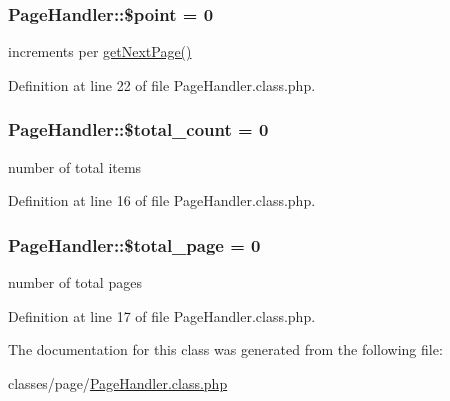 \subsubsection[{\texorpdfstring{\$point}{$point}}]{\setlength{\rightskip}{0pt plus 5cm}Page\+Handler\+::\$point = 0}\hypertarget{classPageHandler_a82a9b55cb98e79d46e6c6648cd2fca26}{}\label{classPageHandler_a82a9b55cb98e79d46e6c6648cd2fca26}


increments per \hyperlink{classPageHandler_a259d01838d005d854d4cc263ba524de7}{get\+Next\+Page()} 



Definition at line 22 of file Page\+Handler.\+class.\+php.

\subsubsection[{\texorpdfstring{\$total\+\_\+count}{$total_count}}]{\setlength{\rightskip}{0pt plus 5cm}Page\+Handler\+::\$total\+\_\+count = 0}\hypertarget{classPageHandler_ad0425a5e936db072a17956e4dada6f2b}{}\label{classPageHandler_ad0425a5e936db072a17956e4dada6f2b}


number of total items 



Definition at line 16 of file Page\+Handler.\+class.\+php.

\subsubsection[{\texorpdfstring{\$total\+\_\+page}{$total_page}}]{\setlength{\rightskip}{0pt plus 5cm}Page\+Handler\+::\$total\+\_\+page = 0}\hypertarget{classPageHandler_adfb101b1d69a89c65cbe405e5d2be0ad}{}\label{classPageHandler_adfb101b1d69a89c65cbe405e5d2be0ad}


number of total pages 



Definition at line 17 of file Page\+Handler.\+class.\+php.



The documentation for this class was generated from the following file\+:\begin{DoxyCompactItemize}
\item 
classes/page/\hyperlink{PageHandler_8class_8php}{Page\+Handler.\+class.\+php}\end{DoxyCompactItemize}
